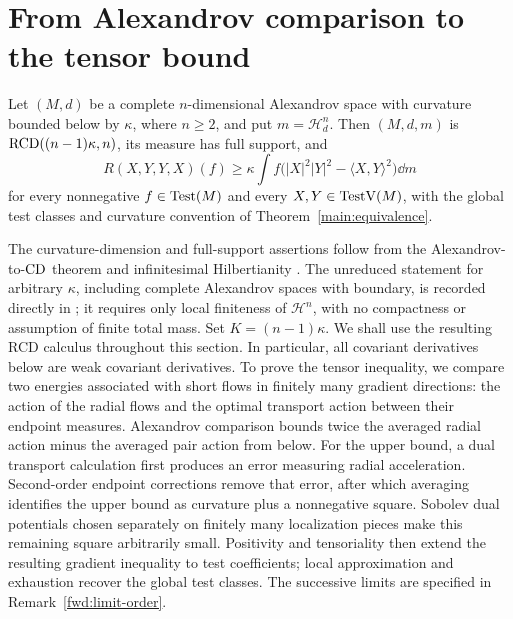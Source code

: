 \section{From Alexandrov comparison to the tensor bound}
\label{sec:forward}

\begin{theorem}
\label{fwd:curvature}
Let \((M,d)\) be a complete \(n\)-dimensional Alexandrov space with
curvature bounded below by \(\kappa\), where \(n\geq2\), and put
\(m=\mathcal H^n_d\). Then \((M,d,m)\) is
\(\mathrm{RCD}((n-1)\kappa,n)\), its measure has full support, and
\begin{equation}
\label{fwd:target}
 R(X,Y,Y,X)(f)
 \geq \kappa\int f\bigl(|X|^2|Y|^2-\langle X,Y\rangle^2\bigr)\dd m
\end{equation}
for every nonnegative \(f\in\operatorname{Test}(M)\) and every
\(X,Y\in\operatorname{TestV}(M)\), with the global test classes and curvature
convention of Theorem~\ref{main:equivalence}.
\end{theorem}

The curvature-dimension and full-support assertions follow from
the Alexandrov-to-\(\mathrm{CD}\) theorem and infinitesimal Hilbertianity
\cite{Petrunin2011,ZhangZhu2010,KMS2001}. The unreduced statement
for arbitrary \(\kappa\), including complete Alexandrov spaces
with boundary, is recorded directly in
\cite[Theorem~2.9 and Corollary~2.10]{KapovitchKettererSturm};
it requires only local finiteness of \(\mathcal H^n\), with no
compactness or assumption of finite total mass. Set
\(K=(n-1)\kappa\). We shall use the resulting RCD calculus throughout
this section. In particular, all covariant derivatives below are weak
covariant derivatives. To prove the tensor inequality, we compare
two energies associated with short flows in finitely many gradient
directions: the action of the radial flows and the optimal transport
action between their endpoint measures. Alexandrov comparison bounds
twice the averaged radial action minus the averaged pair action from
below. For the upper bound, a dual transport calculation first
produces an error measuring radial acceleration. Second-order
endpoint corrections remove that error, after which averaging
identifies the upper bound as curvature plus a nonnegative square.
Sobolev dual potentials chosen separately on finitely many
localization pieces make this remaining square arbitrarily small.
Positivity and tensoriality then extend the resulting gradient inequality to test
coefficients; local approximation and exhaustion recover the global
test classes. The successive limits are specified in
Remark~\ref{fwd:limit-order}.

